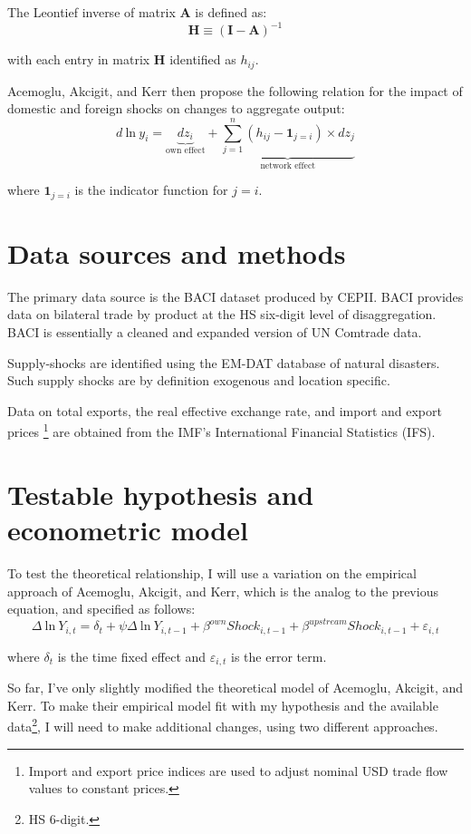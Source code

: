 \documentclass[10pt,letterpaper]{article}
\begin{document}
The Leontief inverse of matrix \textbf{A} is defined as:
$$ \mathbf{H} \equiv (\mathbf{I} - \mathbf{A})^{-1} $$

with each entry in matrix \textbf{H} identified as $h_{ij}$.

Acemoglu, Akcigit, and Kerr then propose the following relation for the impact of domestic and foreign shocks on changes to aggregate output:
$$ d \ \text{ln} \ y_i = \underbrace{dz_i}_{\text{own effect}} + \underbrace{\sum_{j=1}^{n} (h_{ij} - \bm{1}_{j=i}) \times dz_j}_{\text{network effect}}$$

where $\bm{1}_{j=i}$ is the indicator function for $j=i$.
\section{Data sources and methods}
The primary data source is the BACI dataset produced by CEPII. BACI provides data on bilateral trade by product at the HS six-digit level of disaggregation. BACI is essentially a cleaned and expanded version of UN Comtrade data. 

Supply-shocks are identified using the EM-DAT database of natural disasters. Such supply shocks are by definition exogenous and location specific. 

Data on total exports, the real effective exchange rate, and import and export prices \footnote{Import and export price indices are used to adjust nominal USD trade flow values to constant prices.} are obtained from the IMF's International Financial Statistics (IFS).


\section{Testable hypothesis and econometric model}

To test the theoretical relationship, I will use a variation on the empirical approach of Acemoglu, Akcigit, and Kerr, which is the analog to the previous equation, and specified as follows:
$$ \Delta \ \text{ln} \ Y_{i,t} = \delta_t + \psi \Delta \ \text{ln} \ Y_{i,t-1} + \beta^{own}Shock_{i,t-1} + \beta^{upstream}Shock_{i,t-1} + \varepsilon_{i,t}$$

where $\delta_t$ is the time fixed effect and $\varepsilon_{i,t}$ is the error term. 

So far, I've only slightly modified the theoretical model of Acemoglu, Akcigit, and Kerr. To make their empirical model fit with my hypothesis and the available data\footnote{HS 6-digit.}, I will need to make additional changes, using two different approaches.
\end{document}
